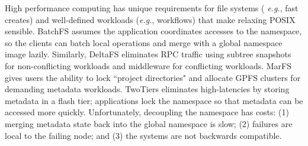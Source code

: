 
High performance computing has unique requirements for file systems ({\it
e.g.}, fast creates) and well-defined workloads ({\it e.g.}, workflows) that
make relaxing POSIX sensible.  BatchFS assumes the application coordinates
accesses to the namespace, so the clients can batch local operations and merge
with a global namespace image lazily. Similarly, DeltaFS eliminates RPC
traffic using subtree snapshots for non-conflicting workloads and middleware
for conflicting workloads. MarFS gives users the ability to lock
``project directories" and allocate GPFS clusters for demanding metadata
workloads. TwoTiers eliminates high-latencies by storing metadata in a flash
tier; applications lock the namespace so that metadata can be accessed more quickly.
Unfortunately, decoupling the namespace has costs: (1) merging metadata state
back into the global namespace is slow; (2) failures are local to the failing
node; and (3) the systems are not backwards compatible. 


